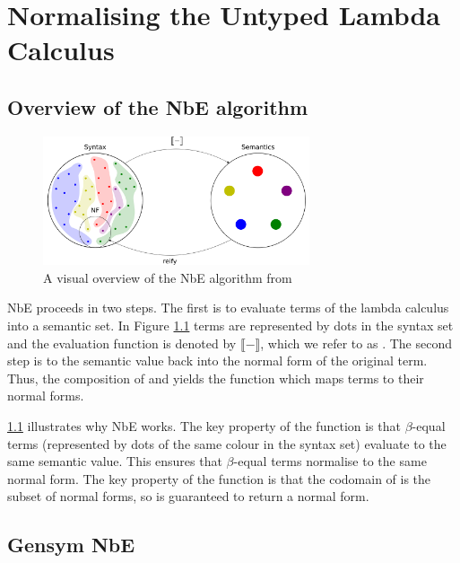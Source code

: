\chapter{Normalising the Untyped Lambda Calculus}
\label{chap:untypednbe}

\section{Overview of the NbE algorithm}

\begin{figure}[h]
    \centering
    \includegraphics[width=0.7\textwidth]{./images/nbe_diagram}
    \caption{A visual overview of the NbE algorithm from \cite{slides}}
    \label{fig:nbeOverview}
\end{figure}

NbE proceeds in two steps. The first is to evaluate terms of the lambda calculus into a semantic set. In Figure \ref{fig:nbeOverview} terms are represented by dots in the syntax set and the evaluation function is denoted by $\llbracket - \rrbracket$, which we refer to as . The second step is to  the semantic value back into the normal form of the original term. Thus, the composition of  and  yields the  function which maps terms to their normal forms. 

\ref{fig:nbeOverview} illustrates why NbE works. The key property of the  function is that $\beta$-equal terms (represented by dots of the same colour in the syntax set) evaluate to the same semantic value. This ensures that $\beta$-equal terms normalise to the same normal form. The key property of the  function is that the codomain of  is the subset of normal forms, so  is guaranteed to return a normal form. 

\section{Gensym NbE}

